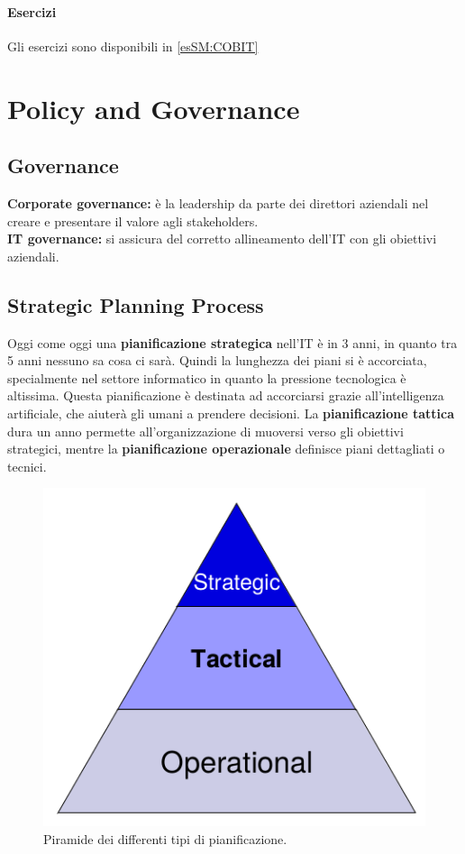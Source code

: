 \subsubsection{Esercizi}

Gli esercizi sono disponibili in \ref{esSM:COBIT}

\chapter{Policy and Governance}
\label{PG}

\section{Governance}

\textbf{Corporate governance:} è la leadership da parte dei direttori 
aziendali nel creare e presentare il valore agli stakeholders.\\
\newline
\textbf{IT governance:} si assicura del corretto allineamento dell'IT con gli 
obiettivi aziendali.



\section{Strategic Planning Process}
\label{PG:SPP}

Oggi come oggi una \textbf{pianificazione strategica} nell'IT è in 3 anni, in 
quanto tra 5 anni nessuno sa cosa ci sarà. Quindi la lunghezza dei piani si è 
accorciata, specialmente nel settore informatico in quanto la pressione 
tecnologica è altissima. Questa pianificazione è destinata ad accorciarsi 
grazie all'intelligenza artificiale, che aiuterà gli umani a prendere 
decisioni. La \textbf{pianificazione tattica} dura un anno permette 
all'organizzazione di muoversi verso gli obiettivi strategici, mentre la 
\textbf{pianificazione operazionale} definisce piani dettagliati o tecnici.

\begin{figure}[H]
        \begin{center}
                \includegraphics[scale=0.4]{res/img/planning_process}
        \end{center}
        \caption{Piramide dei differenti tipi di pianificazione.}    
\end{figure}

